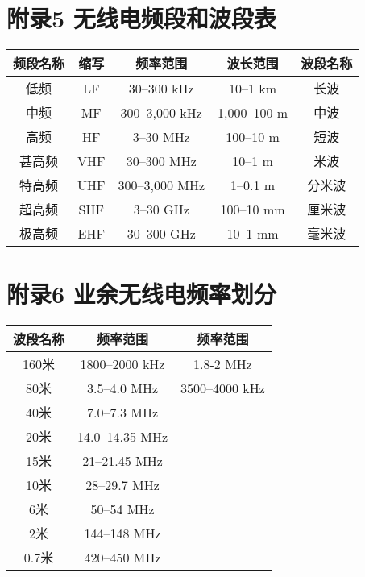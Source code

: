 \newpage

\section{附录5 无线电频段和波段表}

\begin{tabular}{|c|c|c|c|c|}
	\hline
	\textbf{频段名称} & \textbf{缩写} & \textbf{频率范围} & \textbf{波长范围} & \textbf{波段名称} \\
	\hline
	低频 & LF & 30–300 kHz & 10–1 km & 长波 \\
	\hline
	中频 & MF & 300–3,000 kHz & 1,000–100 m & 中波 \\
	\hline
	高频 & HF & 3–30 MHz & 100–10 m & 短波 \\
	\hline
	甚高频 & VHF & 30–300 MHz & 10–1 m & 米波 \\
	\hline
	特高频 & UHF & 300–3,000 MHz & 1–0.1 m & 分米波 \\
	\hline
	超高频 & SHF & 3–30 GHz & 100–10 mm & 厘米波 \\
	\hline
	极高频 & EHF & 30–300 GHz & 10–1 mm & 毫米波 \\
	\hline
\end{tabular}

\newpage






\section{附录6 业余无线电频率划分}


\begin{tabular}{|c|c|c|}
	\hline
	\textbf{波段名称} & \textbf{频率范围} & \textbf{频率范围} \\
	\hline
	160米 & 1800–2000 kHz & 1.8-2 MHz \\
	\hline
	80米 & 3.5–4.0 MHz & 3500–4000 kHz \\
	\hline
	40米 & 7.0–7.3 MHz &  \\
	\hline
	20米 & 14.0–14.35 MHz & \\
	\hline
	15米 & 21–21.45 MHz & \\
	\hline
	10米 & 28–29.7 MHz & \\
	\hline
	6米 & 50–54 MHz & \\
	\hline
	2米 & 144–148 MHz & \\
	\hline
	0.7米 & 420–450 MHz & \\
	\hline
\end{tabular}

